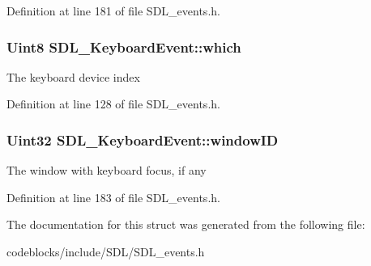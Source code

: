 Definition at line 181 of file S\+D\+L\+\_\+events.\+h.

\hypertarget{structSDL__KeyboardEvent_acb25972bab6a9f142de5652530857b9b}{
\subsubsection[{which}]{\setlength{\rightskip}{0pt plus 5cm}Uint8 S\+D\+L\+\_\+\+Keyboard\+Event\+::which}}\label{structSDL__KeyboardEvent_acb25972bab6a9f142de5652530857b9b}
The keyboard device index 

Definition at line 128 of file S\+D\+L\+\_\+events.\+h.

\hypertarget{structSDL__KeyboardEvent_a56efb6780b96acd5b50d8f797efb3546}{
\subsubsection[{window\+I\+D}]{\setlength{\rightskip}{0pt plus 5cm}Uint32 S\+D\+L\+\_\+\+Keyboard\+Event\+::window\+I\+D}}\label{structSDL__KeyboardEvent_a56efb6780b96acd5b50d8f797efb3546}
The window with keyboard focus, if any 

Definition at line 183 of file S\+D\+L\+\_\+events.\+h.



The documentation for this struct was generated from the following file\+:\begin{DoxyCompactItemize}
\item 
codeblocks/include/\+S\+D\+L/S\+D\+L\+\_\+events.\+h\end{DoxyCompactItemize}
